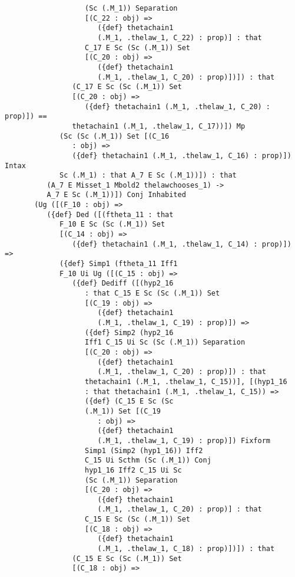 \documentclass[12pt]{article}
\begin{document}
\begin{verbatim}
                   (Sc (.M_1)) Separation 
                   [(C_22 : obj) => 
                      ({def} thetachain1 
                      (.M_1, .thelaw_1, C_22) : prop)] : that 
                   C_17 E Sc (Sc (.M_1)) Set 
                   [(C_20 : obj) => 
                      ({def} thetachain1 
                      (.M_1, .thelaw_1, C_20) : prop)])]) : that 
                (C_17 E Sc (Sc (.M_1)) Set 
                [(C_20 : obj) => 
                   ({def} thetachain1 (.M_1, .thelaw_1, C_20) : prop)]) == 
                thetachain1 (.M_1, .thelaw_1, C_17))]) Mp 
             (Sc (Sc (.M_1)) Set [(C_16 
                : obj) => 
                ({def} thetachain1 (.M_1, .thelaw_1, C_16) : prop)]) Intax 
             Sc (.M_1) : that A_7 E Sc (.M_1))]) : that 
          (A_7 E Misset_1 Mbold2 thelawchooses_1) -> 
          A_7 E Sc (.M_1))]) Conj Inhabited 
       (Ug ([(F_10 : obj) => 
          ({def} Ded ([(ftheta_11 : that 
             F_10 E Sc (Sc (.M_1)) Set 
             [(C_14 : obj) => 
                ({def} thetachain1 (.M_1, .thelaw_1, C_14) : prop)]) => 
             ({def} Simp1 (ftheta_11 Iff1 
             F_10 Ui Ug ([(C_15 : obj) => 
                ({def} Dediff ([(hyp2_16 
                   : that C_15 E Sc (Sc (.M_1)) Set 
                   [(C_19 : obj) => 
                      ({def} thetachain1 
                      (.M_1, .thelaw_1, C_19) : prop)]) => 
                   ({def} Simp2 (hyp2_16 
                   Iff1 C_15 Ui Sc (Sc (.M_1)) Separation 
                   [(C_20 : obj) => 
                      ({def} thetachain1 
                      (.M_1, .thelaw_1, C_20) : prop)]) : that 
                   thetachain1 (.M_1, .thelaw_1, C_15))], [(hyp1_16 
                   : that thetachain1 (.M_1, .thelaw_1, C_15)) => 
                   ({def} (C_15 E Sc (Sc 
                   (.M_1)) Set [(C_19 
                      : obj) => 
                      ({def} thetachain1 
                      (.M_1, .thelaw_1, C_19) : prop)]) Fixform 
                   Simp1 (Simp2 (hyp1_16)) Iff2 
                   C_15 Ui Scthm (Sc (.M_1)) Conj 
                   hyp1_16 Iff2 C_15 Ui Sc 
                   (Sc (.M_1)) Separation 
                   [(C_20 : obj) => 
                      ({def} thetachain1 
                      (.M_1, .thelaw_1, C_20) : prop)] : that 
                   C_15 E Sc (Sc (.M_1)) Set 
                   [(C_18 : obj) => 
                      ({def} thetachain1 
                      (.M_1, .thelaw_1, C_18) : prop)])]) : that 
                (C_15 E Sc (Sc (.M_1)) Set 
                [(C_18 : obj) => 

\end{verbatim}
\end{document}

